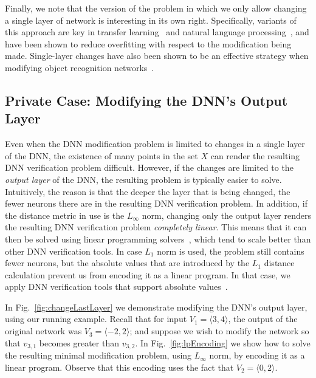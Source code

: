 \documentclass{easychair}
\begin{document}
Finally, we note that the version of the problem in which
we only allow changing a single layer of network is interesting in
its own right. Specifically, variants of this approach are key in
transfer learning~\cite{Gi15,GrDoDaMa14,WeVeWa07,YoClBeLi14} and
natural language processing~\cite{DeChLeTo18,PeNeIvGaClLeZe18,SiZi14},
and have been shown to reduce overfitting with respect to the modification being
made. Single-layer changes have also been shown to be an effective
strategy when modifying  object recognition networks~\cite{ShAzSuCa14}.

\subsection{Private Case: Modifying the DNN's Output Layer}
\label{sec:outputLayer}

Even when the DNN modification problem is limited to changes in a
single layer of the DNN, the existence of many points in the set $X$
can render the resulting DNN verification problem difficult. However, if the changes are limited to the \emph{output
  layer} of the DNN, the resulting problem is typically easier to
solve. Intuitively, the reason is that the deeper the layer that is being changed,
the fewer neurons there are in the resulting DNN verification problem.
In addition, if the distance metric in use is the $L_\infty$ norm,
changing only the output layer renders the resulting DNN verification
problem \emph{completely linear}. This means that it can then be solved using
linear programming solvers~\cite{TjXiTe19}, which tend to scale better than other DNN
verification tools. In case $L_1$ norm is used, the problem still
contains fewer neurons, but the absolute values that are introduced by
the $L_1$ distance calculation prevent us from encoding it as a linear
program. In that case, we apply DNN verification tools that support
absolute values~\cite{KaHuIbJuLaLiShThWuZeDiKoBa19Marabou}.

In Fig.~\ref{fig:changeLastLayer} we demonstrate modifying the DNN's
output layer, using our running example.
Recall that for input $V_1=\langle 3,4\rangle$, the output of the
original network  was $V_3=\langle -2,2 \rangle$; and suppose we wish
to modify the network so that $v_{3,1}$ becomes greater than
$v_{3,2}$. In Fig.~\ref{fig:lpEncoding} we show how to solve the
resulting minimal modification problem, using $L_\infty$ norm, by
encoding it as a linear program. Observe that this encoding uses the
fact that $V_2=\langle 0,2\rangle$.
\end{document}
